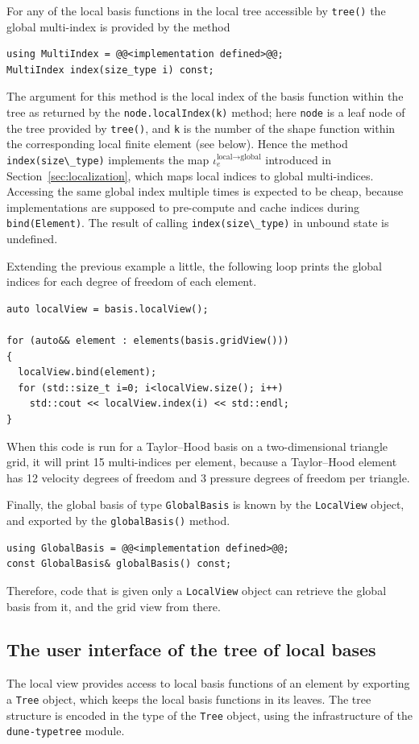 \documentclass[a4paper,10pt,headings=normal,bibliography=totoc]{scrartcl}
\newcommand{\cpp}[1]{\lstinline[basicstyle=\ttfamily]!#1!}
\newcommand{\dunemodule}[1]{\texttt{#1}}
\begin{document}
For any of the local basis functions in the local tree
accessible by \cpp{tree()} the global multi-index
is provided by the method
\begin{lstlisting}[style=Interface]
using MultiIndex = @@<implementation defined>@@;
MultiIndex index(size_type i) const;
\end{lstlisting}
The argument for this method is the local
index of the basis function within the tree as
returned by the \cpp{node.localIndex(k)}
method; here \cpp{node} is a leaf node of the
tree provided by \cpp{tree()}, and \cpp{k}
is the number of the shape function within the corresponding
local finite element (see below).
Hence the method \cpp{index(size\_type)}
implements the map $\iota^{\text{local}\to\text{global}}_e$
introduced in Section~\ref{sec:localization},
which maps local indices to global multi-indices.
Accessing the same global index multiple times
is expected to be cheap, because implementations are supposed to pre-compute
and cache indices during \cpp{bind(Element)}.
The result of calling \cpp{index(size\_type)} in
unbound state is undefined.

Extending the previous example a little, the following loop prints the
global indices for each degree of freedom of each element.
\begin{lstlisting}[style=example]
auto localView = basis.localView();

for (auto&& element : elements(basis.gridView()))
{
  localView.bind(element);
  for (std::size_t i=0; i<localView.size(); i++)
    std::cout << localView.index(i) << std::endl;
}
\end{lstlisting}
When this code is run for a Taylor--Hood basis on a two-dimensional triangle grid,
it will print 15 multi-indices per element, because a Taylor--Hood element has 12
velocity degrees of freedom and 3 pressure degrees of freedom per triangle.

Finally, the global basis of type \cpp{GlobalBasis}
is known by the \cpp{LocalView} object, and exported by the \cpp{globalBasis()} method.
\begin{lstlisting}[style=Interface]
using GlobalBasis = @@<implementation defined>@@;
const GlobalBasis& globalBasis() const;
\end{lstlisting}
%
Therefore, code that is given only a \cpp{LocalView} object can retrieve the
global basis from it, and the grid view from there.


\subsection{The user interface of the tree of local bases}
The local view provides access to local basis functions of an element
by exporting a \cpp{Tree} object, which keeps the local basis functions in its leaves.
The tree structure is encoded in the type of the \cpp{Tree} object,
using the infrastructure of the \dunemodule{dune-typetree} module.
\end{document}
